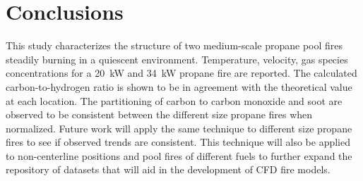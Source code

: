 \documentclass[12pt]{ussci}
\begin{document}
\section{Conclusions}
This study characterizes the structure of two medium-scale propane pool fires steadily burning in a quiescent environment. Temperature, velocity, gas species concentrations for a 20~kW and 34~kW propane fire are reported. The calculated carbon-to-hydrogen ratio is shown to be in agreement with the theoretical value at each location. The  partitioning of carbon to carbon monoxide and soot are observed to be consistent between the different size propane fires when normalized. Future work will apply the same technique to different size propane fires to see if observed trends are consistent. This technique will also be applied to non-centerline positions and pool fires of different fuels to further expand the repository of datasets that will aid in the development of CFD fire models. 

%

\printbibliography
\end{document}
